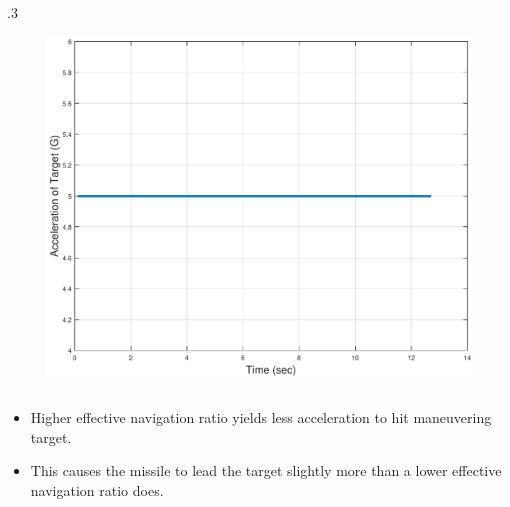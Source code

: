 \documentclass{beamer}
\begin{document}
\begin{frame}
\begin{columns}[c]
	\begin{column} {.3\linewidth}
		\begin{figure}[htb]
			\centering
			\includegraphics[scale = 0.18]{fig/TargetAccelerationXNT5HE0N5.pdf}
		\end{figure}
	\end{column}
	
\end{columns}
\end{frame}

\begin{frame}
\begin{itemize}
	\item Higher effective navigation ratio yields less acceleration to hit maneuvering target.
	\item This causes the missile to lead the target slightly more than a lower effective navigation ratio does.
\end{itemize}
\end{frame}

\end{document}
